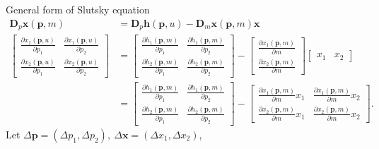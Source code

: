General form of Slutsky equation
\begin{align*}
    \mathbf D_p \mathbf x(\mathbf p, m)
    &=
    \mathbf D_p \mathbf h(\mathbf p, u)
    -
    \mathbf D_m \mathbf x(\mathbf p, m) \mathbf x\\
    \begin{bmatrix}
    \frac{\partial x_1(\mathbf p, u) }{\partial p_1} &
    \frac{\partial x_1(\mathbf p, u) }{\partial p_2} \\
    \frac{\partial x_2(\mathbf p, u) }{\partial p_1} &
    \frac{\partial x_2(\mathbf p, u) }{\partial p_2}
    \end{bmatrix}
    &=
    \begin{bmatrix}
    \frac{\partial h_1(\mathbf p, m) }{\partial p_1} &
    \frac{\partial h_1(\mathbf p, m) }{\partial p_2} \\
    \frac{\partial h_2(\mathbf p, m) }{\partial p_1} &
    \frac{\partial h_2(\mathbf p, m) }{\partial p_2}
    \end{bmatrix}
    -
    \begin{bmatrix}
    \frac{\partial x_1(\mathbf p, m) }{\partial m} \\
    \frac{\partial x_2(\mathbf p, m) }{\partial m} 
    \end{bmatrix}
    \begin{bmatrix}
    x_1 & x_2
    \end{bmatrix}
    \\
    &=
    \begin{bmatrix}
    \frac{\partial h_1(\mathbf p, m) }{\partial p_1} &
    \frac{\partial h_1(\mathbf p, m) }{\partial p_2} \\
    \frac{\partial h_2(\mathbf p, m) }{\partial p_1} &
    \frac{\partial h_2(\mathbf p, m) }{\partial p_2}
    \end{bmatrix}
    -
    \begin{bmatrix}
    \frac{\partial x_1(\mathbf p, m) }{\partial m} x_1 &
    \frac{\partial x_1(\mathbf p, m) }{\partial m} x_2\\
    \frac{\partial x_2(\mathbf p, m) }{\partial m} x_1 &
    \frac{\partial x_2(\mathbf p, m) }{\partial m} x_2
    \end{bmatrix}.
\end{align*}
Let $\Delta \mathbf p =(\Delta p_1, \Delta p_2), \ \Delta \mathbf x =(\Delta x_1, \Delta x_2)$,
